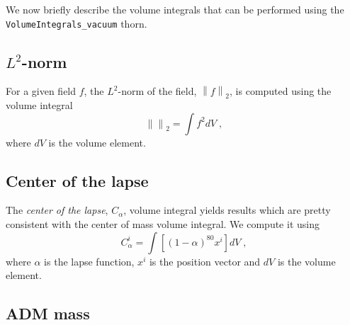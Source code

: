 We now briefly describe the volume integrals that can be performed
using the \texttt{VolumeIntegrals\_vacuum} thorn.

\subsection{$L^{2}$-norm}
\label{sec:L2_norm_integral}

For a given field $f$, the $L^{2}$-norm of the field, $\left\lVert f \right\rVert_{2}$,
is computed using the volume integral
\begin{equation}
\boxed{\left\lVert \right\rVert_{2} = \int f^{2}dV}\; ,
\end{equation}
where $dV$ is the volume element.

\subsection{Center of the lapse}
\label{sec:center_of_lapse}

The \emph{center of the lapse}, $C_{\alpha}$, volume integral yields
results which are pretty consistent with the center of mass volume
integral. We compute it using
\begin{equation}
\boxed{ C_{\alpha}^{i} = \int \left[\left(1-\alpha\right)^{80}x^{i}\right]dV }\; ,
\end{equation}
where $\alpha$ is the lapse function, $x^{i}$ is the position vector
and $dV$ is the volume element.

\subsection{ADM mass}
\label{sec:ADM_mass_integral}

